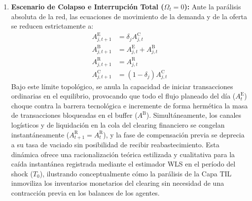 \begin{enumerate}
    \item \textbf{Escenario de Colapso e Interrupci\'on Total ($\Omega_t = 0$):} Ante la par\'alisis absoluta de la red, las ecuaciones de movimiento de la demanda y de la oferta se reducen estrictamente a:
    \begin{align}
        A^{\text{E}}_{j, t+1} &= \delta_j A^{\text{C}}_{j, t} \\
        A^{\text{B}}_{j, t+1} &= A^{\text{E}}_{j, t} + A^{\text{B}}_{j, t} \\
        A^{\text{R}}_{j, t+1} &= A^{\text{R}}_{j, t} \\
        A^{\text{C}}_{j, t+1} &= (1 - \delta_j) A^{\text{C}}_{j, t}
    \end{align}
    Bajo este l\'imite topol\'ogico, se anula la capacidad de iniciar transacciones ordinarias en el equilibrio, provocando que todo el flujo planeado del d\'ia ($A^{\text{E}}_t$) choque contra la barrera tecnol\'ogica e incremente de forma herm\'etica la masa de transacciones bloqueadas en el buffer ($A^{\text{B}}$). Simult\'aneamente, los canales log\'isticos y de liquidaci\'on en la cola del clearing financiero se congelan instant\'aneamente ($A^{\text{R}}_{t+1} = A^{\text{R}}_t$), y la fase de compensaci\'on previa se deprecia a su tasa de vaciado sin posibilidad de recibir reabastecimiento. Esta din\'amica ofrece una racionalizaci\'on te\'orica estilizada y cualitativa para la ca\'ida instant\'anea registrada mediante el estimador WLS en el per\'iodo del shock ($T_0$), ilustrando conceptualmente c\'omo la par\'alisis de la Capa TIL inmoviliza los inventarios monetarios del clearing sin necesidad de una contracci\'on previa en los balances de los agentes.
    

\end{enumerate}

